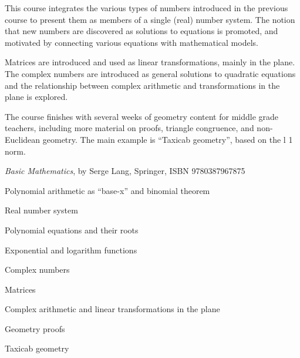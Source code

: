 \documentclass{osucourse}
\begin{document}
\CatalogDescription
\PrerequisitesAndExclusions

\begin{Purpose}
This course integrates the various types of numbers introduced in the previous course to present them as members of a single (real) number system. The notion that new numbers are discovered as solutions to equations is promoted, and motivated by connecting various equations with mathematical models.

Matrices are introduced and used as linear transformations, mainly in the plane. The complex numbers are introduced as general solutions to quadratic equations and the relationship between complex arithmetic and transformations in the plane is explored.

The course finishes with several weeks of geometry content for middle grade teachers, including more material on proofs, triangle congruence, and non-Euclidean geometry. The main example is “Taxicab geometry”, based on the l 1 norm.
\end{Purpose}

\begin{Text}
\emph{Basic Mathematics}, by Serge Lang, Springer, ISBN 9780387967875
\end{Text}

\begin{TopicsList}
\item Polynomial arithmetic as “base-x” and binomial theorem
\item Real number system
\item Polynomial equations and their roots
\item Exponential and logarithm functions
\item Complex numbers
\item Matrices
\item Complex arithmetic and linear transformations in the plane
\item Geometry proofs
\item Taxicab geometry
\end{TopicsList}
\end{document}
